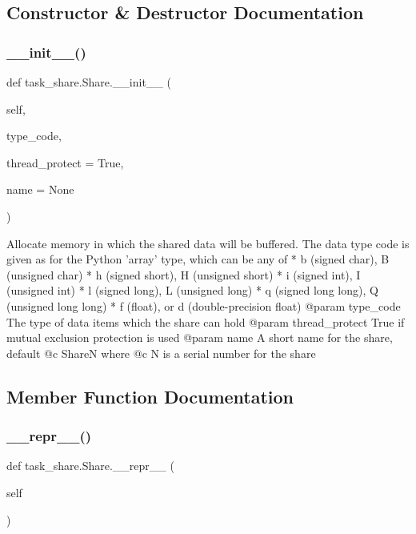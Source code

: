 \subsection{Constructor \& Destructor Documentation}
\mbox{\label{classtask__share_1_1_share_a3139fd0c5d1df7fc15e003892d557b9a}} 
\subsubsection{\texorpdfstring{\_\_init\_\_()}{\_\_init\_\_()}}
{\footnotesize\ttfamily def task\+\_\+share.\+Share.\+\_\+\+\_\+init\+\_\+\+\_\+ (\begin{DoxyParamCaption}\item[{}]{self,  }\item[{}]{type\+\_\+code,  }\item[{}]{thread\+\_\+protect = {\ttfamily True},  }\item[{}]{name = {\ttfamily None} }\end{DoxyParamCaption})}

\begin{DoxyVerb}Allocate memory in which the shared data will be buffered. The 
data type code is given as for the Python 'array' type, which 
can be any of
* b (signed char), B (unsigned char)
* h (signed short), H (unsigned short)
* i (signed int), I (unsigned int)
* l (signed long), L (unsigned long)
* q (signed long long), Q (unsigned long long)
* f (float), or d (double-precision float)
@param type_code The type of data items which the share can hold
@param thread_protect True if mutual exclusion protection is used
@param name A short name for the share, default @c ShareN where @c N
    is a serial number for the share \end{DoxyVerb}
 

\subsection{Member Function Documentation}
\mbox{\label{classtask__share_1_1_share_a09c1c075ae99ea33030dd9de7b9ae470}} 
\subsubsection{\texorpdfstring{\_\_repr\_\_()}{\_\_repr\_\_()}}
{\footnotesize\ttfamily def task\+\_\+share.\+Share.\+\_\+\+\_\+repr\+\_\+\+\_\+ (\begin{DoxyParamCaption}\item[{}]{self }\end{DoxyParamCaption})}

